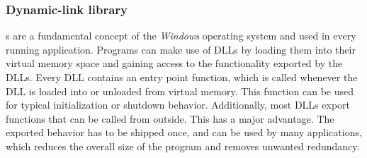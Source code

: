 \subsubsection{Dynamic-link library}
s are a fundamental concept of the \emph{Windows} operating system and used in every running application. Programs can make use of \glspl{DLL} by loading them into their virtual memory space and gaining access to the functionality exported by the \glspl{DLL}. Every \gls{DLL} contains an entry point function, which is called whenever the \gls{DLL} is loaded into or unloaded from virtual memory. This function can be used for typical initialization or shutdown behavior. Additionally, most \glspl{DLL} export functions that can be called from outside. This has a major advantage. The exported behavior has to be shipped once, and can be used by many applications, which reduces the overall size of the program and removes unwanted redundancy.
